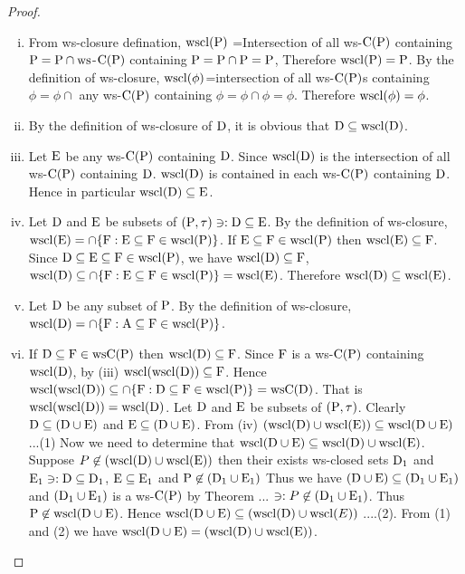 \begin{proof}
\begin{enumerate}[(i)]
\item From ws-closure defination, $\mathrm{wscl}(\mathrm{P})$ =Intersection of all ws-$\mathrm{C}(\mathrm{P})$ containing $\mathrm{P} =\mathrm{P} \cap \mathrm{ws}$-$\mathrm{C}(\mathrm{P})$ containing $\mathrm{P}=\mathrm{P}\cap \mathrm{P} =\mathrm{P}$, Therefore $\mathrm{wscl}(\mathrm{P})=\mathrm{P}$. By the definition of ws-closure, $\mathrm{wscl}(\phi)$=intersection of all ws-$\mathrm{C}(\mathrm{P})$s containing $\phi =\phi\cap$  any ws-$\mathrm{C}(\mathrm{P})$ containing $\phi= \phi\cap \phi=\phi$. Therefore $\mathrm{wscl}(\phi)=\phi$.

\item By the definition of ws-closure of $\mathrm{D}$, it is obvious that $\mathrm{D}\subseteq  \mathrm{wscl}(\mathrm{D})$.

\item Let $\mathrm{E}$ be any ws-$\mathrm{C}(\mathrm{P})$ containing $\mathrm{D}$. Since $\mathrm{wscl}(\mathrm{D})$ is the intersection of all ws-$\mathrm{C}(\mathrm{P})$ containing $\mathrm{D}$. $\mathrm{wscl}(\mathrm{D})$ is contained in each ws-$\mathrm{C}(\mathrm{P})$ containing $\mathrm{D}$. Hence in particular $\mathrm{wscl}(\mathrm{D})\subseteq \mathrm{E}$.

\item Let $\mathrm{D}$ and $\mathrm{E}$  be subsets of $(\mathrm{P},\tau) \ni: \mathrm{D}\subseteq \mathrm{E}$. By the definition of ws-closure, $\mathrm{wscl}(\mathrm{E})=\cap \{\mathrm{F}: \mathrm{E}\subseteq \mathrm{F}\in \mathrm{wscl}(\mathrm{P})\}$. If $\mathrm{E}\subseteq \mathrm{F}\in \mathrm{wscl}(\mathrm{P})$ then $\mathrm{wscl}(\mathrm{E})\subseteq \mathrm{F}$. Since $\mathrm{D}\subseteq \mathrm{E} \subseteq \mathrm{F}\in \mathrm{wscl}(\mathrm{P})$, we have $\mathrm{wscl}(\mathrm{D})\subseteq \mathrm{F}$, $\mathrm{wscl}(\mathrm{D})\subseteq \cap \{\mathrm{F}: \mathrm{E}\subseteq \mathrm{F}\in \mathrm{wscl}(\mathrm{P})\}=\mathrm{wscl}(\mathrm{E})$. Therefore $\mathrm{wscl}(\mathrm{D})\subseteq \mathrm{wscl}(\mathrm{E})$.

\item Let $\mathrm{D}$ be any subset of $\mathrm{P}$. By the definition of ws-closure, $\mathrm{wscl}(\mathrm{D})=\cap \{\mathrm{F}: \mathrm{A}\subseteq \mathrm{F} \in \mathrm{wscl}(\mathrm{P})\}$.

\item If $\mathrm{D}\subseteq \mathrm{F}\in \mathrm{ws}\mathrm{C}(\mathrm{P})$ then $\mathrm{wscl}(\mathrm{D})\subseteq \mathrm{F}$. Since $\mathrm{F}$ is a ws-$\mathrm{C}(\mathrm{P})$ containing $\mathrm{wscl}(\mathrm{D})$, by (iii) $\mathrm{wscl}(\mathrm{wscl}(\mathrm{D}))\subseteq \mathrm{F}$. Hence $\mathrm{wscl}(\mathrm{wscl}(\mathrm{D}))\subseteq \cap \{\mathrm{F}: \mathrm{D}\subseteq \mathrm{F}\in \mathrm{wscl}(\mathrm{P})\}=\mathrm{ws} \mathrm{C}(\mathrm{D})$. That is $\mathrm{wscl}(\mathrm{wscl}(\mathrm{D}))=\mathrm{wscl}(\mathrm{D})$. Let $\mathrm{D}$ and $\mathrm{E}$  be subsets of $(\mathrm{P},\tau)$. Clearly $\mathrm{D}\subseteq (\mathrm{D}\cup \mathrm{E})$ and $\mathrm{E}\subseteq (\mathrm{D}\cup \mathrm{E})$. From (iv) $(\mathrm{wscl}(\mathrm{D})\cup \mathrm{wscl}(\mathrm{E}))\subseteq \mathrm{wscl}(\mathrm{D}\cup \mathrm{E})$ ...(1) Now we need to determine that $\mathrm{wscl}(\mathrm{D}\cup \mathrm{E})\subseteq \mathrm{wscl}(\mathrm{D})\cup \mathrm{wscl}(\mathrm{E})$. Suppose $P\not\in (\mathrm{wscl}(\mathrm{D})\cup \mathrm{wscl}(\mathrm{E}))$ then their exists ws-closed sets $\mathrm{D}_{1}$ and $\mathrm{E}_{1}\ni: \mathrm{D}\subseteq \mathrm{D}_{1}$, $\mathrm{E}\subseteq \mathrm{E}_{1}$ and $\mathrm{P}\not\in (\mathrm{D}_{1} \cup \mathrm{E}_{1})$ Thus we have $(\mathrm{D}\cup \mathrm{E})\subseteq (\mathrm{D}_{1} \cup \mathrm{E}_{1})$ and $(\mathrm{D}_{1} \cup \mathrm{E}_{1})$ is a ws-$\mathrm{C}(\mathrm{P})$ by Theorem ... $\ni: P\not\in (\mathrm{D}_{1} \cup \mathrm{E}_{1})$. Thus $\mathrm{P}\not\in \mathrm{wscl}(\mathrm{D}\cup \mathrm{E})$. Hence $\mathrm{wscl}(\mathrm{D}\cup \mathrm{E})\subseteq (\mathrm{wscl}(\mathrm{D})\cup \mathrm{wscl}(E))$ ....(2). From (1) and (2) we have $\mathrm{wscl}(\mathrm{D}\cup \mathrm{E})=(\mathrm{wscl}(\mathrm{D})\cup \mathrm{wscl}(\mathrm{E}))$.
\end{enumerate}
\end{proof}

